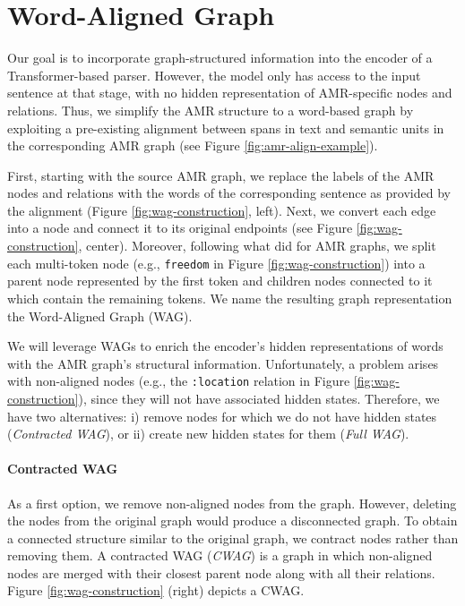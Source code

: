 \documentclass[11pt]{article}
\begin{document}
\section{Word-Aligned Graph}\label{section:wag}

Our goal is to incorporate graph-structured information into the encoder of a Transformer-based parser. However, the model only has access to the input sentence at that stage, with no hidden representation of AMR-specific nodes and relations. Thus, we simplify the AMR structure to a word-based graph by exploiting a pre-existing alignment between spans in text and semantic units in the corresponding AMR graph (see Figure \ref{fig:amr-align-example}). 

First, starting with the source AMR graph, we replace the labels of the AMR nodes and relations with the words of the corresponding sentence as provided by the alignment (Figure \ref{fig:wag-construction}, left).
Next, we convert each edge into a node and connect it to its original endpoints (see Figure \ref{fig:wag-construction}, center).  Moreover, following what \citet{struct-adapt} did for AMR graphs, we split each multi-token node (e.g., \texttt{freedom} in Figure \ref{fig:wag-construction}) into a parent node represented by the first token and children nodes connected to it which contain the remaining tokens. We name the resulting graph representation the Word-Aligned Graph (WAG). 

We will leverage WAGs to enrich the encoder's hidden representations of words with the AMR graph's structural information. Unfortunately, a problem arises with non-aligned nodes (e.g., the \texttt{:location} relation in Figure \ref{fig:wag-construction}), since they will not have associated hidden states. Therefore, we have two alternatives: i) remove nodes for which we do not have hidden states (\textit{Contracted WAG}), or ii) create new hidden states for them (\textit{Full WAG}).

\paragraph{Contracted WAG}\label{wag-contract}
As a first option, we remove non-aligned nodes from the graph. However, deleting the nodes from the original graph would produce a disconnected graph. To obtain a connected structure similar to the original graph, we contract nodes rather than removing them. A contracted WAG (\textit{CWAG}) is a graph in which non-aligned nodes are merged with their closest parent node along with all their relations. Figure \ref{fig:wag-construction} (right) depicts a CWAG. 
\end{document}
